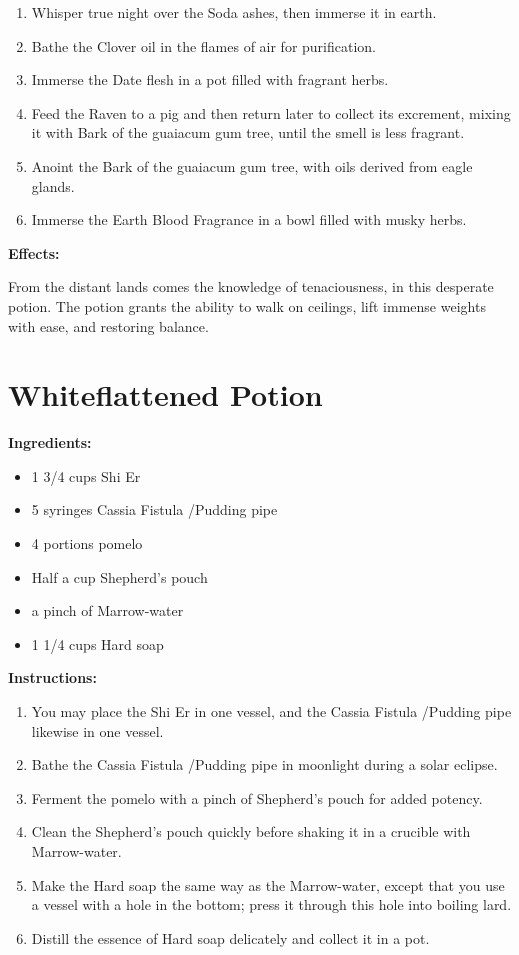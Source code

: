 \documentclass{article}
\begin{document}
\begin{enumerate}
  \item Whisper true night over the Soda ashes, then immerse it in earth.
  \item Bathe the Clover oil in the flames of air for purification.
  \item Immerse the Date flesh in a pot filled with fragrant herbs.
  \item Feed the Raven to a pig and then return later to collect its excrement, mixing it with Bark of the guaiacum gum tree, until the smell is less fragrant.
  \item Anoint the Bark of the guaiacum gum tree, with oils derived from eagle glands.
  \item Immerse the Earth Blood Fragrance in a bowl filled with musky herbs.
\end{enumerate}

\textbf{Effects:}

From the distant lands comes the knowledge of tenaciousness, in this desperate potion. The potion grants the ability to walk on ceilings, lift immense weights with ease, and restoring balance.

\newpage
\section*{Whiteflattened Potion}

\textbf{Ingredients:}

\begin{itemize}
  \item 1 3/4 cups Shi Er
  \item 5 syringes Cassia Fistula /Pudding pipe
  \item 4 portions pomelo
  \item Half a cup Shepherd's pouch
  \item a pinch of Marrow-water
  \item 1 1/4 cups Hard soap
\end{itemize}

\textbf{Instructions:}

\begin{enumerate}
  \item You may place the Shi Er in one vessel, and the Cassia Fistula /Pudding pipe likewise in one vessel.
  \item Bathe the Cassia Fistula /Pudding pipe in moonlight during a solar eclipse.
  \item Ferment the pomelo with a pinch of Shepherd's pouch for added potency.
  \item Clean the Shepherd's pouch quickly before shaking it in a crucible with Marrow-water.
  \item Make the Hard soap the same way as the Marrow-water, except that you use a vessel with a hole in the bottom; press it through this hole into boiling lard.
  \item Distill the essence of Hard soap delicately and collect it in a pot.
\end{enumerate}
\end{document}
